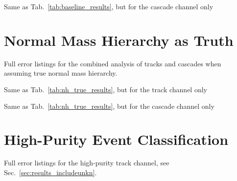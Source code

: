 \begin{table}[h!]
 \caption{Same as Tab.~\ref{tab:baseline_results}, but for the cascade channel
  only}
 \begin{center}
  \small{}
 \end{center}
\end{table}

\FloatBarrier
\section*{\label{app:fisher_nhtrue}
\thesection\quad Normal Mass Hierarchy as Truth}

\begin{table}[h!]
 \caption{Full error listings for the combined analysis of tracks and cascades
  when assuming true normal mass hierarchy.}
 \label{tab:nh_true_results}
 \begin{center}
  \small{}
 \end{center}
\end{table}

\begin{table}[h!]
 \caption{Same as Tab.~\ref{tab:nh_true_results}, but for the track channel
  only}
 \begin{center}
  \small{}
 \end{center}
\end{table}

\begin{table}[h!]
 \caption{Same as Tab.~\ref{tab:nh_true_results}, but for the cascade channel
  only}
 \begin{center}
  \small{}
 \end{center}
\end{table}


\clearpage
\section*{\label{app:fisher_threechannel}
\thesection\quad High-Purity Event Classification}

\begin{table}[h!]
 \caption{Full error listings for the high-purity track channel, see
Sec.~\ref{sec:results_includeunkn}.}
 \begin{center}
  \small{}
 \end{center}
\end{table}

